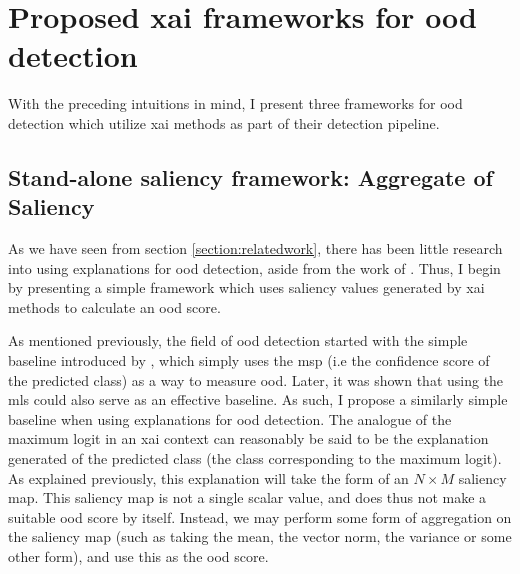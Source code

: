 \documentclass[UKenglish]{uiomasterthesis} %
\theoremstyle{definition}
\begin{document}
\section{Proposed \ac{xai} frameworks for \ac{ood} detection} \label{section:methods}

With the preceding intuitions in mind, I present three frameworks for \ac{ood} detection which utilize \ac{xai} methods as part of their detection pipeline.

\subsection{Stand-alone saliency framework: Aggregate of Saliency} \label{section:saliencyagg_method}

As we have seen from section \ref{section:relatedwork}, there has been little research into using explanations for \ac{ood} detection, aside from the work of \cite{martinez}. Thus, I begin by presenting a simple framework which uses saliency values generated by \ac{xai} methods to calculate an \ac{ood} score.

As mentioned previously, the field of \ac{ood} detection started with the simple baseline introduced by \cite{oodbaseline}, which simply uses the \ac{msp} (i.e the confidence score of the predicted class) as a way to measure \ac{ood}. Later, it was shown that using the \ac{mls} could also serve as an effective baseline. As such, I propose a similarly simple baseline when using explanations for \ac{ood} detection. The analogue of the maximum logit in an \ac{xai} context can reasonably be said to be the explanation generated of the predicted class (the class corresponding to the maximum logit). As explained previously, this explanation will take the form of an $N \times M$ saliency map. This saliency map is not a single scalar value, and does thus not make a suitable \ac{ood} score by itself. Instead, we may perform some form of aggregation on the saliency map (such as taking the mean, the vector norm, the variance or some other form), and use this as the \ac{ood} score.
\end{document}
